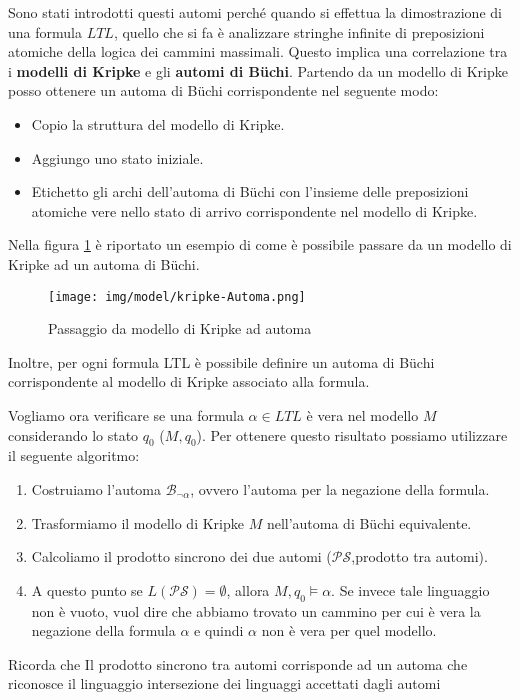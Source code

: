 Sono stati introdotti questi automi perché quando si effettua la dimostrazione di 
una formula $LTL$, quello che si fa è analizzare stringhe infinite di preposizioni
atomiche della logica dei cammini massimali. Questo implica una correlazione tra
i \textbf{modelli di Kripke} e gli \textbf{automi di Büchi}. Partendo da un modello 
di Kripke posso ottenere un automa di Büchi corrispondente nel seguente modo:
\begin{itemize}
    \item Copio la struttura del modello di Kripke.
    \item Aggiungo uno stato iniziale.
    \item Etichetto gli archi dell'automa di Büchi con l'insieme delle preposizioni
    atomiche vere nello stato di arrivo corrispondente nel modello di Kripke.
\end{itemize}

\begin{esempio}
    Nella figura \ref{fig:kripke-automa} è riportato un esempio di come è
    possibile passare da un modello di Kripke ad un automa di Büchi.
    \begin{figure}
        \centering
        \texttt{[image: img/model/kripke-Automa.png]}
        \caption{Passaggio da modello di Kripke ad automa}
        \label{fig:kripke-automa}
    \end{figure}
\end{esempio}

Inoltre, per ogni formula LTL è possibile definire un automa di Büchi corrispondente
al modello di Kripke associato alla formula.

Vogliamo ora verificare se una formula $\alpha \in LTL$ è vera nel modello $M$
considerando lo stato $q_0$ ($M, q_0$). Per ottenere questo risultato possiamo
utilizzare il seguente algoritmo:
\begin{enumerate}
    \item Costruiamo l'automa $\mathcal{B}_{\lnot \alpha}$, ovvero l'automa per
          la negazione della formula.
    \item Trasformiamo il modello di Kripke $M$ nell'automa di Büchi equivalente.
    \item Calcoliamo il prodotto sincrono dei due automi ($\mathcal{PS}$,prodotto tra automi).
    \item A questo punto se $L(\mathcal{PS}) = \emptyset$, allora $M, q_0 \models
              \alpha$. Se invece tale linguaggio non è vuoto, vuol dire che
          abbiamo trovato un cammino per cui è vera la negazione della formula
          $\alpha$ e quindi $\alpha$ non è vera per quel modello.
\end{enumerate}
\begin{nota}
    Ricorda che Il prodotto sincrono tra automi corrisponde ad un automa che riconosce
    il linguaggio intersezione dei linguaggi accettati dagli automi  
\end{nota}
